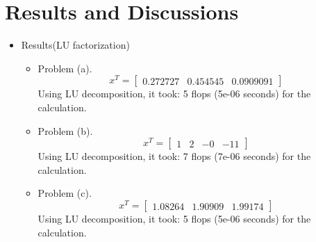 \documentclass[12pt]{beamer}
\begin{document}
		
\section{Results and Discussions}
\begin{frame}
\begin{itemize}
       \item{Results(LU factorization)}
       \begin{itemize}
       \item Problem (a).\[
       x^T =
       \begin{bmatrix}
       	0.272727 &
       	0.454545 &
       	0.0909091	
       \end{bmatrix}
       \]
      Using LU decomposition, it took: 5 flops (5e-06 seconds) for the calculation.
       \item Problem (b).\[
              x^T =
              \begin{bmatrix}
              	1 &	2 & -0 &-11	
              \end{bmatrix}
              \]
              Using LU decomposition, it took: 7 flops (7e-06 seconds) for the calculation.
       \item Problem (c).\[
                     x^T =
                     \begin{bmatrix}
                     	1.08264 &	
                     	1.90909 &
                     	1.99174
                     \end{bmatrix}
                     \]
 Using LU decomposition, it took: 5 flops (5e-06 seconds) for the calculation.
                     
       \end{itemize}
        \end{itemize}
       \end{frame}
\end{document}
